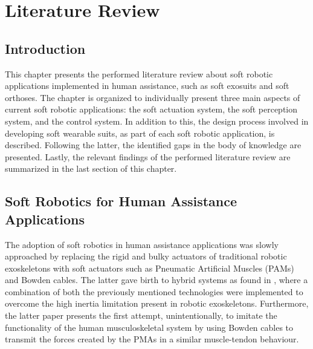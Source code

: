\chapter{Literature Review}

\section{Introduction}

This chapter presents the performed literature review about soft robotic applications implemented in human assistance, such as soft exosuits and soft orthoses. The chapter is organized to individually present three main aspects of current soft robotic applications: the soft actuation system, the soft perception system, and the control system. In addition to this, the design process involved in developing soft wearable suits, as part of each soft robotic application, is described. Following the latter, the identified gaps in the body of knowledge are presented. Lastly, the relevant findings of the performed literature review are summarized in the last section of this chapter.

\section{Soft Robotics for Human Assistance Applications}

The adoption of soft robotics in human assistance applications was slowly approached by replacing the rigid and bulky actuators of traditional robotic exoskeletons with soft actuators such as Pneumatic Artificial Muscles (PAMs) and Bowden cables. The latter gave birth to hybrid systems as found in \cite{Noda2014}, where a combination of both the previously mentioned technologies were implemented to overcome the high inertia limitation present in robotic exoskeletons. Furthermore, the latter paper presents the first attempt, unintentionally, to imitate the functionality of the human musculoskeletal system by using Bowden cables to transmit the forces created by the PMAs in a similar muscle-tendon behaviour. 

